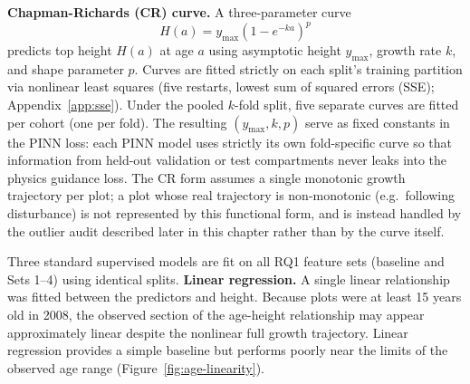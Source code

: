 \documentclass[logo,msc,ai]{infthesis}           %
\begin{document}
\textbf{Chapman-Richards (CR) curve.} A three-parameter curve
\begin{equation}
H(a) = y_{\max}\left(1-e^{-ka}\right)^{p}
\label{eq:cr}
\end{equation}
predicts top height $H(a)$ at age $a$ using asymptotic height $y_{\max}$, growth rate $k$, and shape parameter $p$. Curves are fitted strictly on each split's training partition via nonlinear least squares (five restarts, lowest sum of squared errors (SSE); Appendix~\ref{app:sse}). Under the pooled $k$-fold split, five separate curves are fitted per cohort (one per fold). The resulting $(y_{\max}, k, p)$ serve as fixed constants in the PINN loss: each PINN model uses strictly its own fold-specific curve so that information from held-out validation or test compartments never leaks into the physics guidance loss. The CR form assumes a single monotonic growth trajectory per plot; a plot whose real trajectory is non-monotonic (e.g.\ following disturbance) is not represented by this functional form, and is instead handled by the outlier audit described later in this chapter rather than by the curve itself. %

Three standard supervised models are fit on all RQ1 feature sets (baseline and Sets 1–4) using identical splits.
\textbf{Linear regression.} A single linear relationship was fitted between the predictors and height. Because plots were at least 15 years old in 2008, the observed section of the age-height relationship may appear approximately linear despite the nonlinear full growth trajectory. Linear regression provides a simple baseline but performs poorly near the limits of the observed age range (Figure~\ref{fig:age-linearity}).

\end{document}
